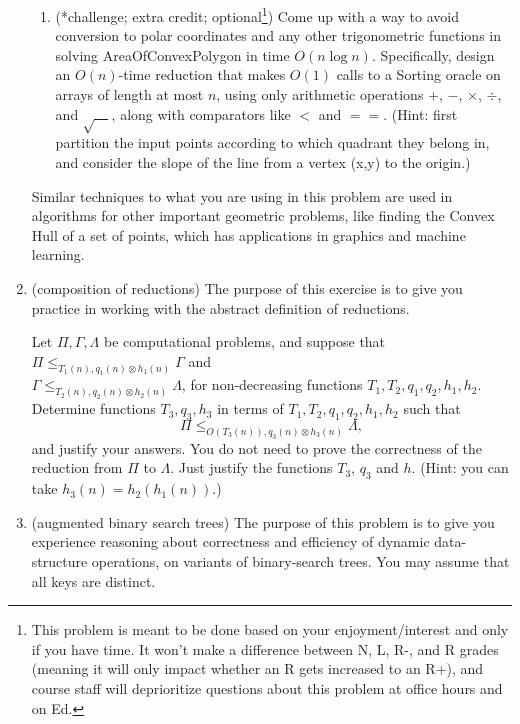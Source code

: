 \documentclass[11pt]{article}
\begin{document}
\begin{enumerate}
\begin{enumerate}
        
        \item (*challenge; extra credit; optional\footnote{This problem is meant to be done based on your enjoyment/interest and only if you have time. It won't make a difference between N, L, R-, and R grades (meaning it will only impact whether an R gets increased to an R+), and course staff will deprioritize questions about this problem at office hours and on Ed.})  Come up with a way to avoid conversion to polar coordinates and any other trigonometric functions in solving AreaOfConvexPolygon in time $O(n\log n)$.  Specifically, design an $O(n)$-time reduction that makes $O(1)$ calls to a Sorting oracle on arrays of length at most $n$, using only arithmetic operations $+$, $-$, $\times$, $\div$, and $\sqrt{\hspace{1em}}$, along with comparators like $<$ and $==$.  (Hint: first partition the input points according to which quadrant they belong in, and consider the slope of the line from a vertex (x,y) to the origin.) \label{part:nopolar}

    
 
\end{enumerate}
    
    Similar techniques to what you are using in this problem are used in algorithms for other important geometric problems, like finding the Convex Hull of a set of points, which has applications in graphics and machine learning.

    \item (composition of reductions) The purpose of this exercise is to give you practice in working with the abstract definition of reductions. 
    
    Let $\Pi, \Gamma, \Lambda$ be computational problems, and suppose that $\Pi\leq_{T_1(n),q_1(n)\otimes h_1(n)} \Gamma$ and \\ $\Gamma \leq_{T_2(n),q_2(n)\otimes h_2(n)} \Lambda$, for non-decreasing functions $T_1,T_2,q_1,q_2,h_1,h_2$.  Determine functions $T_3,q_3,h_3$ in terms of $T_1,T_2,q_1,q_2,h_1,h_2$ such that 
    $$\Pi \leq_{O(T_3(n)),q_3(n)\otimes h_3(n)} \Lambda,$$
    and justify your answers. You do not need to prove the correctness of the reduction from $\Pi$ to $\Lambda$. Just justify the functions $T_3$, $q_3$ and $h$. (Hint: you can take $h_3(n)=h_2(h_1(n))$.)
    

    
    \newpage

    
    \item (augmented binary search trees) The purpose of this problem is to give you experience reasoning about correctness and efficiency of dynamic data-structure operations, on variants of binary-search trees. You may assume that all keys are distinct.


\end{enumerate}
\end{document}
